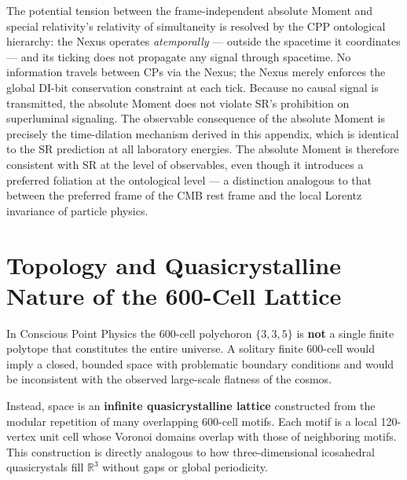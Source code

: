 \documentclass[11pt,letterpaper]{article}
\begin{document}
The potential tension between the frame-independent absolute Moment and 
special relativity's relativity of simultaneity is resolved by the CPP 
ontological hierarchy: the Nexus operates \emph{atemporally} — outside 
the spacetime it coordinates — and its ticking does not propagate any 
signal through spacetime. No information travels between CPs via the 
Nexus; the Nexus merely enforces the global DI-bit conservation 
constraint at each tick. Because no causal signal is transmitted, the 
absolute Moment does not violate SR's prohibition on superluminal 
signaling. The observable consequence of the absolute Moment is 
precisely the time-dilation mechanism derived in this appendix, which 
is identical to the SR prediction at all laboratory energies. The 
absolute Moment is therefore consistent with SR at the level of 
observables, even though it introduces a preferred foliation at the 
ontological level — a distinction analogous to that between the 
preferred frame of the CMB rest frame and the local Lorentz invariance 
of particle physics.

\section{Topology and Quasicrystalline Nature of the 600-Cell Lattice}\label{app:C}

In Conscious Point Physics the 600-cell polychoron $\{3,3,5\}$ is \textbf{not} a single finite polytope that constitutes the entire universe. A solitary finite 600-cell would imply a closed, bounded space with problematic boundary conditions and would be inconsistent with the observed large-scale flatness of the cosmos.

Instead, space is an \textbf{infinite quasicrystalline lattice} constructed from the modular repetition of many overlapping 600-cell motifs. Each motif is a local 120-vertex unit cell whose Voronoi domains overlap with those of neighboring motifs. This construction is directly analogous to how three-dimensional icosahedral quasicrystals fill $\mathbb{R}^3$ without gaps or global periodicity.

\end{document}
